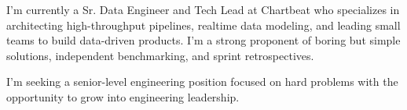 
\begin{cvparagraph}

	I'm currently a Sr. Data Engineer and Tech Lead at Chartbeat who specializes in architecting high-throughput pipelines, realtime data modeling, and leading small teams to build data-driven products. I'm a strong proponent of boring but simple solutions, independent benchmarking, and sprint retrospectives.
	
	I'm seeking a senior-level engineering position focused on hard problems with the opportunity to grow into engineering leadership.
	
\end{cvparagraph}

